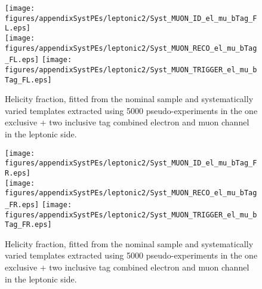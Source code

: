 \begin{figure}[!hb]
\begin{center}
        \texttt{[image: figures/appendixSystPEs/leptonic2/Syst\_MUON\_ID\_el\_mu\_bTag\_FL.eps]}\\
        \texttt{[image: figures/appendixSystPEs/leptonic2/Syst\_MUON\_RECO\_el\_mu\_bTag\_FL.eps]}
        \texttt{[image: figures/appendixSystPEs/leptonic2/Syst\_MUON\_TRIGGER\_el\_mu\_bTag\_FL.eps]}        
\caption{Helicity fraction, \fl fitted from the nominal \ttbar sample and systematically varied templates extracted using 5000 pseudo-experiments in the one exclusive + two inclusive \bt tag combined electron and muon channel in the leptonic side. }
\label{fig:systematicVar_lep_fL_elmu2incl_MUON}
\end{center}
\end{figure}

\begin{figure}[!hb]
\begin{center}
        \texttt{[image: figures/appendixSystPEs/leptonic2/Syst\_MUON\_ID\_el\_mu\_bTag\_FR.eps]}\\
        \texttt{[image: figures/appendixSystPEs/leptonic2/Syst\_MUON\_RECO\_el\_mu\_bTag\_FR.eps]}
        \texttt{[image: figures/appendixSystPEs/leptonic2/Syst\_MUON\_TRIGGER\_el\_mu\_bTag\_FR.eps]}        
\caption{Helicity fraction, \fr fitted from the nominal \ttbar sample and systematically varied templates extracted using 5000 pseudo-experiments in the one exclusive + two inclusive \bt tag combined electron and muon channel in the leptonic side. }
\label{fig:systematicVar_lep_fR_elmu2incl_MUON}
\end{center}
\end{figure}

